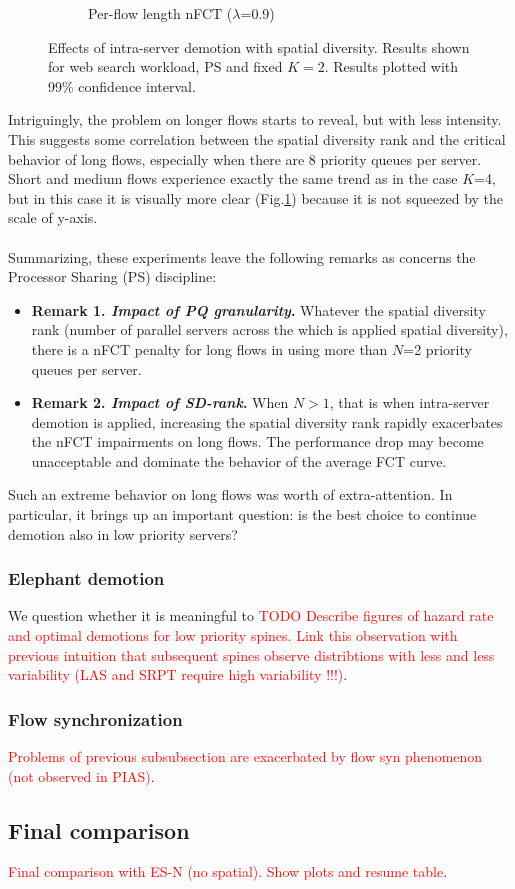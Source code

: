 \begin{figure}
\begin{subfigure}{.5\textwidth}
		\caption{Per-flow length nFCT ($\lambda$=0.9)}
		\label{fig:sdmlfq-variable-N-fct-detailed-K2}
	\end{subfigure}%
	\caption{Effects of intra-server demotion with spatial diversity. Results shown for web search workload, PS and fixed $K=2$. Results plotted with 99\% confidence interval.}
	\label{fig:sdmlfq-variable-N-K2}
\end{figure}%
Intriguingly, the problem on longer flows starts to reveal, but with less intensity. This suggests some correlation between the spatial diversity rank and the critical behavior of long flows, especially when there are 8 priority queues per server.  Short and medium flows experience exactly the same trend as in the case $K$=4, but in this case it is visually more clear (Fig.\ref{fig:sdmlfq-variable-N-fct-detailed-K2}) because it is not squeezed by the scale of y-axis. \\\\
Summarizing, these experiments leave the following remarks as concerns the Processor Sharing (PS) discipline:
\begin{itemize}
	\item \textbf{Remark 1. \textit{Impact of PQ granularity}.} Whatever the spatial diversity rank (number of parallel servers across the which is applied spatial diversity), there is a nFCT penalty for long flows in using more than $N$=2 priority queues per server.
	\item \textbf{Remark 2. \textit{Impact of SD-rank}.} When $N>1$, that is when intra-server demotion is applied, increasing the spatial diversity rank rapidly exacerbates the nFCT impairments on long flows. The performance drop may become unacceptable and dominate the behavior of the average FCT curve.
\end{itemize}
Such an extreme behavior on long flows was worth of extra-attention. In particular, it brings up an important question: is the best choice to continue demotion also in low priority servers?
\subsubsection{Elephant demotion}
We question whether it is meaningful to 
\textcolor{red}{TODO Describe figures of hazard rate and optimal demotions for low priority spines. Link this observation with previous intuition that subsequent spines observe distribtions with less and less variability (LAS and SRPT require high variability !!!)}. 
\subsubsection{Flow synchronization}
\textcolor{red}{Problems of previous subsubsection are exacerbated by flow syn phenomenon (not observed in PIAS)}.
\subsection{Final comparison}
\textcolor{red}{Final comparison with ES-N (no spatial). Show plots and resume table}.
